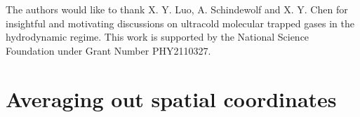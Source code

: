 \documentclass[reprint, amsmath, amssymb, aps, superscriptaddress]{revtex4-1}
\begin{document}
 





\begin{acknowledgments}

The authors would like to thank X. Y. Luo, A. Schindewolf and X. Y. Chen for insightful and motivating discussions on ultracold molecular trapped gases in the hydrodynamic regime.
This work is supported by the National Science Foundation under Grant Number PHY2110327. 

\end{acknowledgments}


\appendix





\section{ Averaging out spatial coordinates \label{app:spatial_averaging} }
\end{document}
